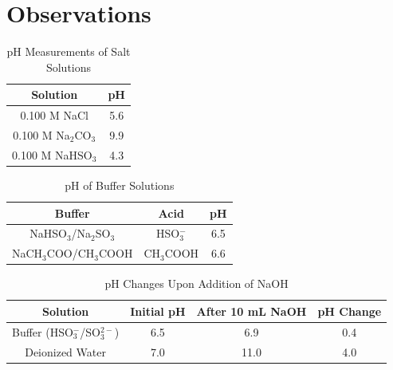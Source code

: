 \documentclass{article}
\begin{document}
\section*{Observations}


\begin{table}[ht!]
    \centering
    \caption{pH Measurements of Salt Solutions}
    \label{tab:part1-observations}
    \vspace{0.125 in}
    \renewcommand{\arraystretch}{2.5}
    \begin{tabular}{|c|c|}
        \hline
        \textbf{Solution} & \textbf{pH} \\
        \hline
        0.100 M NaCl & 5.6 \\
        \hline
        0.100 M Na$_2$CO$_3$ & 9.9 \\
        \hline
        0.100 M NaHSO$_3$ & 4.3 \\
        \hline
    \end{tabular}
\end{table}


\begin{table}[ht!]
    \centering
    \caption{pH of Buffer Solutions}
    \label{tab:part2-observations}
    \vspace{0.125 in}
    \renewcommand{\arraystretch}{2.5}
    \begin{tabular}{|c|c|c|}
        \hline
        \textbf{Buffer} & \textbf{Acid} & \textbf{pH} \\
        \hline
        NaHSO$_3$/Na$_2$SO$_3$ & HSO$_3^-$ & 6.5 \\
        \hline
        NaCH$_3$COO/CH$_3$COOH & CH$_3$COOH & 6.6 \\
        \hline
    \end{tabular}
\end{table}


\begin{table}[ht!]
    \centering
    \caption{pH Changes Upon Addition of NaOH}
    \label{tab:part3-observations}
    \vspace{0.125 in}
    \renewcommand{\arraystretch}{2.5}
    \begin{tabular}{|c|c|c|c|}
        \hline
        \textbf{Solution} & \textbf{Initial pH} & \textbf{After 10 mL NaOH} & \textbf{pH Change} \\
        \hline
        Buffer (HSO$_3^-$/SO$_3^{2-}$) & 6.5 & 6.9 & 0.4 \\
        \hline
        Deionized Water & 7.0 & 11.0 & 4.0 \\
        \hline
    \end{tabular}
\end{table}
\newpage
\end{document}
